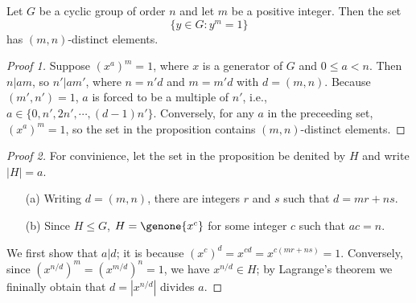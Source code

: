 \begin{prop}
    Let $G$ be a cyclic group of order $n$ and let $m$ be a positive integer.
    Then the set
    \begin{equation*}
        \{y\in G: y^m=1\}
    \end{equation*}
    has $(m, n)$-distinct elements.
\end{prop}
\begin{proof}[Proof 1]
    Suppose $(x^a)^m=1$, where $x$ is a generator of $G$ and $0\leq a<n$.
    Then $n|am$, so $n'|am'$, where $n=n'd$ and $m=m'd$ with $d=(m, n)$.
    Because $(m', n')=1$, $a$ is forced to be a multiple of $n'$, i.e., $a\in\{0, n', 2n', \cdots, (d-1)n'\}$.
    Conversely, for any $a$ in the preceeding set, $(x^a)^m=1$, so the set in the proposition contains $(m, n)$-distinct elements.
\end{proof}
\begin{proof}[Proof 2]
    For convinience, let the set in the proposition be denited by $H$ and write $|H|=a$.
    \begin{enumerate}
        \item[(a)]
        {
            Writing $d=(m, n)$, there are integers $r$ and $s$ such that $d=mr+ns$.
        }
        \item[(b)]
        {
            Since $H\leq G$, $H=\genone{x^c}$ for some integer $c$ such that $ac=n$.
        }
    \end{enumerate}
    We first show that $a|d$; it is because $(x^c)^d=x^{cd}=x^{c(mr+ns)}=1$.
    Conversely, since $(x^{n/d})^m=(x^{m/d})^n=1$, we have $x^{n/d}\in H$; by Lagrange's theorem we fininally obtain that $d=|x^{n/d}|$ divides $a$.
\end{proof}